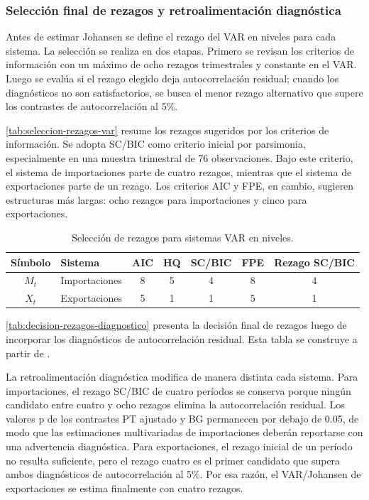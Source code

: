 \documentclass[11pt,a4paper]{article}
\begin{document}
	\subsubsection{Selección final de rezagos y retroalimentación diagnóstica}
	\label{subsubsec:seleccion-rezagos-diagnostico}

	Antes de estimar Johansen se define el rezago del VAR en niveles para cada
	sistema. La selección se realiza en dos etapas. Primero se revisan los criterios
	de información con un máximo de ocho rezagos trimestrales y constante en el
	VAR. Luego se evalúa si el rezago elegido deja autocorrelación residual; cuando
	los diagnósticos no son satisfactorios, se busca el menor rezago alternativo
	que supere los contrastes de autocorrelación al 5\%.

	\autoref{tab:seleccion-rezagos-var} resume los rezagos sugeridos por los
	criterios de información. Se adopta SC/BIC como criterio inicial por parsimonia,
	especialmente en una muestra trimestral de 76 observaciones. Bajo este criterio,
	el sistema de importaciones parte de cuatro rezagos, mientras que el sistema de
	exportaciones parte de un rezago. Los criterios AIC y FPE, en cambio, sugieren
	estructuras más largas: ocho rezagos para importaciones y cinco para
	exportaciones.

	\begin{table}[H]
		\centering
		\caption{Selección de rezagos para sistemas VAR en niveles.}
		\label{tab:seleccion-rezagos-var}
		\small
		\begin{tabular}{clccccc}
			\toprule
			Símbolo & Sistema & AIC & HQ & SC/BIC & FPE & Rezago SC/BIC \\
			\midrule
			\(M_t\) & Importaciones & 8 & 5 & 4 & 8 & 4 \\
			\(X_t\) & Exportaciones & 5 & 1 & 1 & 5 & 1 \\
			\bottomrule
		\end{tabular}
	\end{table}

	\autoref{tab:decision-rezagos-diagnostico} presenta la decisión final de
	rezagos luego de incorporar los diagnósticos de autocorrelación residual. Esta
	tabla se construye a partir de
	.

	La retroalimentación diagnóstica modifica de manera distinta cada sistema. Para
	importaciones, el rezago SC/BIC de cuatro períodos se conserva porque ningún
	candidato entre cuatro y ocho rezagos elimina la autocorrelación residual. Los
	valores p de los contrastes PT ajustado y BG permanecen por debajo de 0.05, de
	modo que las estimaciones multivariadas de importaciones deberán reportarse con
	una advertencia diagnóstica. Para exportaciones, el rezago inicial de un período
	no resulta suficiente, pero el rezago cuatro es el primer candidato que supera
	ambos diagnósticos de autocorrelación al 5\%. Por esa razón, el VAR/Johansen de
	exportaciones se estima finalmente con cuatro rezagos.
\end{document}
